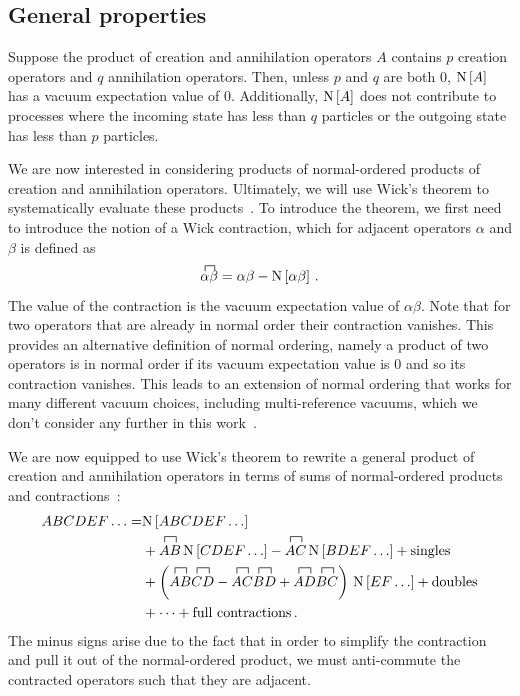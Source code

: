 \subsection{General properties}\label{sec:normal_ordering_properties}

Suppose the product of creation and annihilation operators $A$
contains $p$ creation operators and $q$ annihilation operators.
Then, unless $p$ and $q$ are both 0,
$\text{N}\left[A\right]$ has a vacuum expectation value of 0.
Additionally, $\text{N}\left[A\right]$ does not contribute to processes
where the incoming state has less than $q$ particles
or the outgoing state has less than $p$ particles.

We are now interested in considering products of normal-ordered products
of creation and annihilation operators.
Ultimately, we will use Wick's theorem to systematically evaluate these products~\cite{Wick50wickthm}.
To introduce the theorem, we first need to introduce the notion of a Wick contraction,
which for adjacent operators $\alpha$ and $\beta$ is defined as
\begin{equation}
  \acontraction{}{\alpha}{}{\beta}
  \alpha \beta = \alpha \beta - \nogen{\alpha \beta}\,.
\end{equation}
The value of the contraction is the vacuum expectation value of $\alpha \beta$.
Note that for two operators that are already in normal order their contraction vanishes.
This provides an alternative definition of normal ordering,
namely a product of two operators is in normal order
if its vacuum expectation value is 0
and so its contraction vanishes.
This leads to an extension of normal ordering
that works for many different vacuum choices,
including multi-reference vacuums,
which we don't consider any further in this work~\cite{Kutz97mrno}.

We are now equipped to use Wick's theorem
to rewrite a general product of creation and annihilation operators
in terms of sums of normal-ordered products and contractions~\cite{Wick50wickthm}:
\begin{equation}\label{eq:wicks_theorem}
  \begin{split}
    ABCDEF\ldots =& \nogen{ABCDEF\ldots} \\
    & + \acontraction{}{A}{}{B} AB \,\nogen{CDEF\ldots} - \acontraction{}{A}{}{C} AC \,\nogen{BDEF\ldots} + \text{singles}\\
    &+ \left(\acontraction{}{A}{}{B} AB \acontraction{}{C}{}{D} CD
    - \acontraction{}{A}{}{C} AC \acontraction{}{B}{}{D} BD
    + \acontraction{}{A}{}{D} AD \acontraction{}{B}{}{C} BC\right) \, \nogen{EF\ldots} + \text{doubles} \\
    &+ \cdots + \text{full contractions}\,.
  \end{split}
\end{equation}
The minus signs arise due to the fact that in order to simplify the contraction
and pull it out of the normal-ordered product,
we must anti-commute the contracted operators such that they are adjacent.

